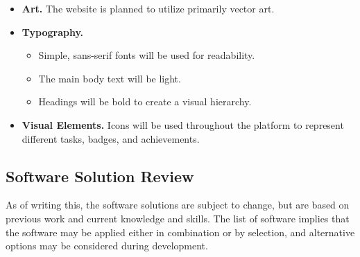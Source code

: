 \begin{enumerate}
\begin{itemize}
\begin{itemize}
            \end{itemize}
        \item \textbf{Art.} The website is planned to utilize primarily vector art.
        \item \textbf{Typography.} 
            \begin{itemize}
            \item Simple, sans-serif fonts will be used for readability. 
            \item The main body text will be light. 
            \item Headings will be bold to create a visual hierarchy.
            \end{itemize}
        \item \textbf{Visual Elements.} Icons will be used throughout the platform to represent different tasks, badges, and achievements.
    \end{itemize}
\end{enumerate}
%

\subsection{Software Solution Review}
%
As of writing this, the software solutions are subject to change, but are based on previous work and current knowledge and skills. 
The list of software implies that the software may be applied either in combination or by selection, and alternative options may be considered during development.\\
%

